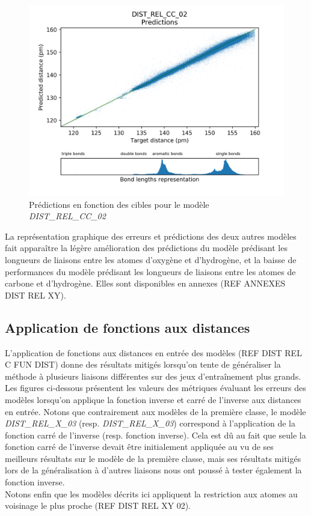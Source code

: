 \begin{figure}[!h]
	\centering
	
	\includegraphics[scale=0.8]{../figures/DIST_REL_CC_02/DIST_REL_CC_02_preds_targets.png}	
	
	\caption{Prédictions en fonction des cibles pour le modèle \emph{DIST\_REL\_CC\_02}}
	
\end{figure}

\par La représentation graphique des erreurs et prédictions des deux autres modèles fait apparaître la légère amélioration des prédictions du modèle prédisant les longueurs de liaisons entre les atomes d'oxygène et d'hydrogène, et la baisse de performances du modèle prédisant les longueurs de liaisons entre les atomes de carbone et d'hydrogène. Elles sont disponibles en annexes (REF ANNEXES DIST REL XY).
	
\subsection{Application de fonctions aux distances}
\par L'application de fonctions aux distances en entrée des modèles (REF DIST REL C FUN DIST) donne des résultats mitigés lorsqu'on tente de généraliser la méthode à plusieurs liaisons différentes sur des jeux d'entraînement plus grands. Les figures ci-dessous présentent les valeurs des métriques évaluant les erreurs des modèles lorsqu'on applique la fonction inverse et carré de l'inverse aux distances en entrée. Notons que contrairement aux modèles de la première classe, le modèle \emph{DIST\_REL\_X\_03} (resp. \emph{DIST\_REL\_X\_03}) correspond à l'application de la fonction carré de l'inverse (resp. fonction inverse). Cela est dû au fait que seule la fonction carré de l'inverse devait être initialement appliquée au vu de ses meilleurs résultats sur le modèle de la première classe, mais ses résultats mitigés lors de la généralisation à d'autres liaisons nous ont poussé à tester également la fonction inverse.\\
Notons enfin que les modèles décrits ici appliquent la restriction aux atomes au voisinage le plus proche (REF DIST REL XY 02).


